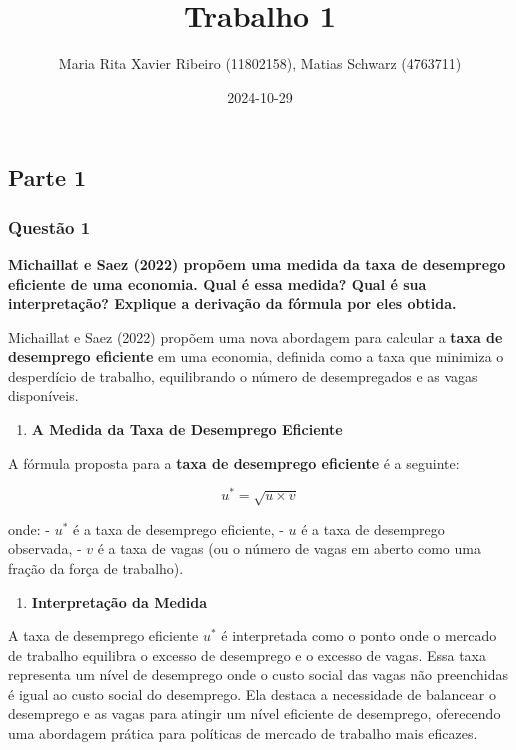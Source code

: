 \documentclass[
]{article}
\title{Trabalho 1}
\author{Maria Rita Xavier Ribeiro (11802158), Matias Schwarz (4763711)}
\date{2024-10-29}
\providecommand{\tightlist}{%
  \setlength{\itemsep}{0pt}\setlength{\parskip}{0pt}}
\begin{document}
\maketitle

{
\setcounter{tocdepth}{2}
\tableofcontents
}
\subsection{Parte 1}\label{parte-1}

\subsubsection{Questão 1}\label{questuxe3o-1}

\textbf{Michaillat e Saez (2022) propõem uma medida da taxa de
desemprego eficiente de uma economia. Qual é essa medida? Qual é sua
interpretação? Explique a derivação da fórmula por eles obtida.}

Michaillat e Saez (2022) propõem uma nova abordagem para calcular a
\textbf{taxa de desemprego eficiente} em uma economia, definida como a
taxa que minimiza o desperdício de trabalho, equilibrando o número de
desempregados e as vagas disponíveis.

\begin{enumerate}
\def\labelenumi{\arabic{enumi}.}
\tightlist
\item
  \textbf{A Medida da Taxa de Desemprego Eficiente}
\end{enumerate}

A fórmula proposta para a \textbf{taxa de desemprego eficiente} é a
seguinte:

\[ u^* = \sqrt{u \times v} \]

onde: - \(u^*\) é a taxa de desemprego eficiente, - \(u\) é a taxa de
desemprego observada, - \(v\) é a taxa de vagas (ou o número de vagas em
aberto como uma fração da força de trabalho).

\begin{enumerate}
\def\labelenumi{\arabic{enumi}.}
\setcounter{enumi}{1}
\tightlist
\item
  \textbf{Interpretação da Medida}
\end{enumerate}

A taxa de desemprego eficiente \(u^*\) é interpretada como o ponto onde
o mercado de trabalho equilibra o excesso de desemprego e o excesso de
vagas. Essa taxa representa um nível de desemprego onde o custo social
das vagas não preenchidas é igual ao custo social do desemprego. Ela
destaca a necessidade de balancear o desemprego e as vagas para atingir
um nível eficiente de desemprego, oferecendo uma abordagem prática para
políticas de mercado de trabalho mais eficazes.
\end{document}
